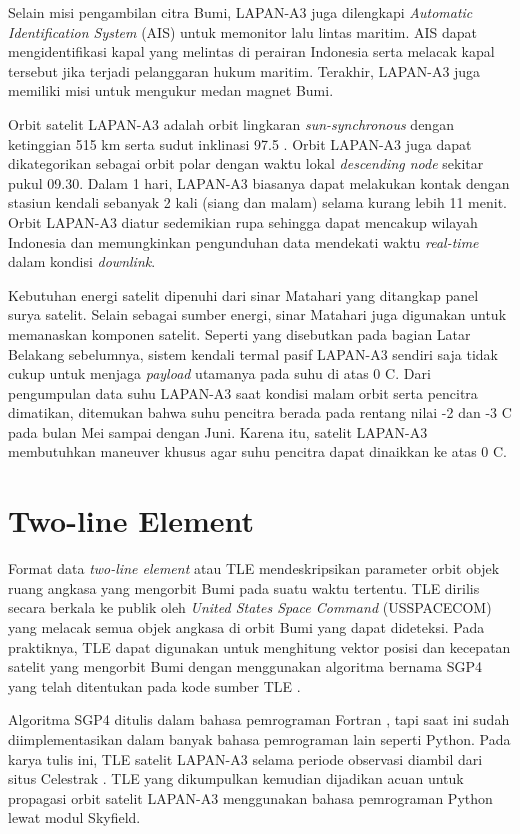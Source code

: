 Selain misi pengambilan citra Bumi, LAPAN-A3 juga dilengkapi \textit{Automatic
Identification System} (AIS) untuk memonitor lalu lintas maritim. AIS dapat
mengidentifikasi kapal yang melintas di perairan Indonesia serta melacak kapal
tersebut jika terjadi pelanggaran hukum maritim. Terakhir, LAPAN-A3 juga
memiliki misi untuk mengukur medan magnet Bumi.

Orbit satelit LAPAN-A3 adalah orbit lingkaran \textit{sun-synchronous} dengan
ketinggian 515 km serta sudut inklinasi 97.5 \degree. Orbit LAPAN-A3 juga dapat
dikategorikan sebagai orbit polar dengan waktu lokal \textit{descending node}
sekitar pukul 09.30. Dalam 1 hari, LAPAN-A3 biasanya dapat melakukan kontak
dengan stasiun kendali sebanyak 2 kali (siang dan malam) selama kurang lebih 11
menit. Orbit LAPAN-A3 diatur sedemikian rupa sehingga dapat mencakup wilayah
Indonesia dan memungkinkan pengunduhan data mendekati waktu \textit{real-time}
dalam kondisi \textit{downlink}.

Kebutuhan energi satelit dipenuhi dari sinar Matahari yang ditangkap panel
surya satelit. Selain sebagai sumber energi, sinar Matahari juga digunakan
untuk memanaskan komponen satelit. Seperti yang disebutkan pada bagian Latar
Belakang sebelumnya, sistem kendali termal pasif LAPAN-A3 sendiri saja tidak
cukup untuk menjaga \textit{payload} utamanya pada suhu di atas 0 \degree C.
Dari pengumpulan data suhu LAPAN-A3 saat kondisi malam orbit serta pencitra
dimatikan, ditemukan bahwa suhu pencitra berada pada rentang nilai -2 dan -3
\degree C pada bulan Mei sampai dengan Juni. Karena itu, satelit LAPAN-A3
membutuhkan maneuver khusus agar suhu pencitra dapat dinaikkan ke atas 0
\degree C.

\section{Two-line Element}

Format data \textit{two-line element} atau TLE mendeskripsikan parameter orbit
objek ruang angkasa yang mengorbit Bumi pada suatu waktu tertentu. TLE dirilis
secara berkala ke publik oleh \textit{United States Space Command} (USSPACECOM)
yang melacak semua objek angkasa di orbit Bumi yang dapat dideteksi. Pada
praktiknya, TLE dapat digunakan untuk menghitung vektor posisi dan kecepatan
satelit yang mengorbit Bumi dengan menggunakan algoritma bernama SGP4 yang
telah ditentukan pada kode sumber TLE \cite{vallado2008}.

Algoritma SGP4 ditulis dalam bahasa pemrograman Fortran \cite{vallado2006},
tapi saat ini sudah diimplementasikan dalam banyak bahasa pemrograman lain
seperti Python. Pada karya tulis ini, TLE satelit LAPAN-A3 selama periode
observasi diambil dari situs Celestrak \cite{kelso}. TLE yang dikumpulkan
kemudian dijadikan acuan untuk propagasi orbit satelit LAPAN-A3 menggunakan
bahasa pemrograman Python lewat modul Skyfield.

